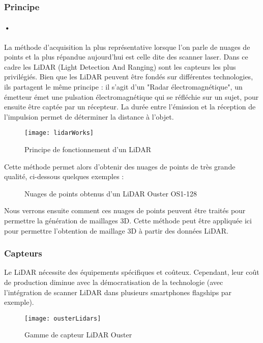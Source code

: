 \subsubsection{Principe}
\paragraph{•} La méthode d'acquisition la plus représentative lorsque l'on parle de nuages de points et la plus répandue aujourd'hui est celle dite des scanner laser. Dans ce cadre les LiDAR (Light Detection And Ranging) sont les capteurs les plus privilégiés. Bien que les LiDAR peuvent être fondés sur différentes technologies, ils partagent le même principe : il s'agit d'un "Radar électromagnétique", un émetteur émet une pulsation électromagnétique qui se réfléchie sur un sujet, pour ensuite être captée par un récepteur. La durée entre l'émission et la réception de l'impulsion permet de déterminer la distance à l'objet.

\begin{figure}[h]
    \centering
    \texttt{[image: lidarWorks]}
    \caption{Principe de fonctionnement d'un LiDAR}
    \label{fig:lidarWork}
\end{figure}
\FloatBarrier
Cette méthode permet alors d'obtenir des nuages de points de très grande qualité, ci-dessous quelques exemples :

\begin{figure}[h]
    \centering
    \qquad
    \caption{Nuages de points obtenus d'un LiDAR Ouster OS1-128}
    \label{fig:PCLidar}
\end{figure}
\FloatBarrier

Nous verrons ensuite comment ces nuages de points peuvent être traités pour permettre la génération de maillages 3D. Cette méthode peut être appliquée ici pour permettre l'obtention de maillage 3D à partir des données LiDAR.

\subsubsection{Capteurs}
Le LiDAR nécessite des équipements spécifiques et coûteux. Cependant, leur coût de production diminue avec la démocratisation de la technologie (avec l'intégration de scanner LiDAR dans plusieurs smartphones flagships par exemple).
\begin{figure}[h]
    \centering
    \texttt{[image: ousterLidars]}
    \caption{Gamme de capteur LiDAR Ouster}
    \label{fig:ousterLidars}
\end{figure}
\FloatBarrier


